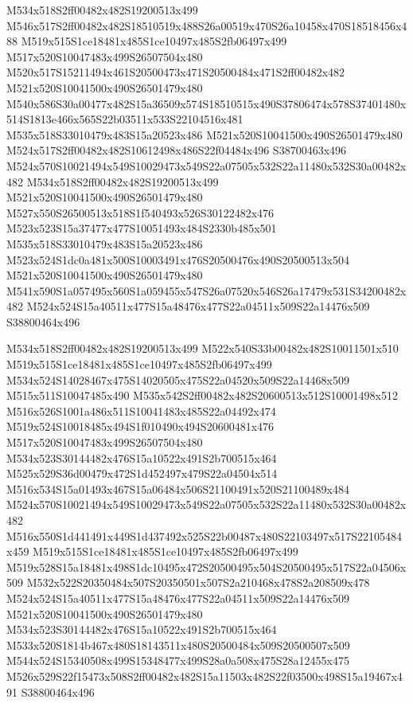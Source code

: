 \documentclass{article}
\begin{document}
\begin{multicols}{2}
M534x518S2ff00482x482S19200513x499 M546x517S2ff00482x482S18510519x488S26a00519x470S26a10458x470S18518456x488 M519x515S1ce18481x485S1ce10497x485S2fb06497x499 M517x520S10047483x499S26507504x480 M520x517S15211494x461S20500473x471S20500484x471S2ff00482x482 M521x520S10041500x490S26501479x480 M540x586S30a00477x482S15a36509x574S18510515x490S37806474x578S37401480x514S1813e466x565S22b03511x533S22104516x481 M535x518S33010479x483S15a20523x486 M521x520S10041500x490S26501479x480 M524x517S2ff00482x482S10612498x486S22f04484x496 S38700463x496 M524x570S10021494x549S10029473x549S22a07505x532S22a11480x532S30a00482x482 M534x518S2ff00482x482S19200513x499 M521x520S10041500x490S26501479x480 M527x550S26500513x518S1f540493x526S30122482x476 M523x523S15a37477x477S10051493x484S2330b485x501 M535x518S33010479x483S15a20523x486 M523x524S1dc0a481x500S10003491x476S20500476x490S20500513x504 M521x520S10041500x490S26501479x480 M541x590S1a057495x560S1a059455x547S26a07520x546S26a17479x531S34200482x482 M524x524S15a40511x477S15a48476x477S22a04511x509S22a14476x509 S38800464x496

M534x518S2ff00482x482S19200513x499 M522x540S33b00482x482S10011501x510 M519x515S1ce18481x485S1ce10497x485S2fb06497x499 M534x524S14028467x475S14020505x475S22a04520x509S22a14468x509 M515x511S10047485x490 M535x542S2ff00482x482S20600513x512S10001498x512 M516x526S1001a486x511S10041483x485S22a04492x474 M519x524S10018485x494S1f010490x494S20600481x476 M517x520S10047483x499S26507504x480 M534x523S30144482x476S15a10522x491S2b700515x464 M525x529S36d00479x472S1d452497x479S22a04504x514 M516x534S15a01493x467S15a06484x506S21100491x520S21100489x484 M524x570S10021494x549S10029473x549S22a07505x532S22a11480x532S30a00482x482 M516x550S1d441491x449S1d437492x525S22b00487x480S22103497x517S22105484x459 M519x515S1ce18481x485S1ce10497x485S2fb06497x499 M519x528S15a18481x498S1dc10495x472S20500495x504S20500495x517S22a04506x509 M532x522S20350484x507S20350501x507S2a210468x478S2a208509x478 M524x524S15a40511x477S15a48476x477S22a04511x509S22a14476x509 M521x520S10041500x490S26501479x480 M534x523S30144482x476S15a10522x491S2b700515x464 M533x520S1814b467x480S18143511x480S20500484x509S20500507x509 M544x524S15340508x499S15348477x499S28a0a508x475S28a12455x475 M526x529S22f15473x508S2ff00482x482S15a11503x482S22f03500x498S15a19467x491 S38800464x496


\end{multicols}
\end{document}

